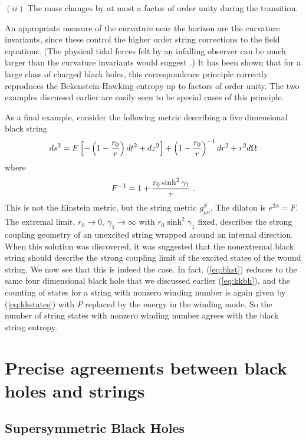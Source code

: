 \documentclass[12pt]{article}
\newcommand{\sect}[1]{\section{#1}\setcounter{equation}{0}}
\newcommand{\eq}{\begin{equation}}
\newcommand{\eqe}{\end{equation}}
\newcommand{\e}[1]{\label{eq:#1}}
\newcommand{\ee}[1]{(\ref{eq:#1})}
\begin{document}
$(ii)$ The mass changes by at most a factor of order unity during the
transition.

\noindent An appropriate measure of the curvature near the horizon are the
curvature invariants, since these control the higher order string corrections
to the field equations. 
(The physical tidal forces felt by an infalling observer can be
much larger than the curvature invariants would suggest \cite{horo}.) 
It has been shown \cite{hopo} that for a large class of charged black holes, 
this
correspondence principle correctly reproduces the Bekenstein-Hawking entropy 
up to factors of order unity. The two examples discussed earlier are easily
seen to be special cases of this principle. 

As a final example, consider
the following metric describing a five dimensional  black string 
\cite{host1}
\eq\e{bkst}
ds^2 = F\left[ -\left( 1-{r_0\over r}\right) d t^2 + d z^2\right]
+ \left( 1-{r_0\over r}\right)^{-1} dr^2 + r^2 d\Omega
\eqe
where
\eq
F^{-1}= 1+ {r_0 \sinh^2 \gamma_1\over r}\ .
\eqe
This is not the Einstein metric, but the string metric $g^S_{\mu\nu}$.
The dilaton is $e^{2\phi} = F$.
The extremal limit, $r_0 \rightarrow 0,   \ \gamma_1 \rightarrow \infty$ with
$r_0 \sinh^2 \gamma_1$ fixed, describes the strong coupling geometry of
an unexcited string wrapped around
an internal
direction. 
When this solution was discovered, it was suggested that
the nonextremal black string should describe the strong coupling limit
of the excited states of the wound string. We now see that this is indeed
the case. In fact, \ee{bkst}
reduces to the same four dimensional black hole 
that we discussed earlier \ee{kkbh},
and the counting of states for a string with
nonzero winding number is
again given by \ee{kkstates} with $P$ replaced by the energy in the
winding mode. So the number of string states 
with nonzero winding number agrees with the black string
entropy.




\sect{Precise agreements between black holes and strings}

\subsection{Supersymmetric Black Holes}
\end{document}
